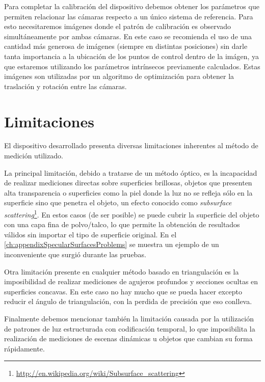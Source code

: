 Para completar la calibración del dispositivo debemos obtener los parámetros que permiten relacionar las cámaras respecto a un único sistema de referencia. Para esto necesitaremos imágenes donde el patrón de calibración es observado simultáneamente por ambas cámaras. En este caso se recomienda el uso de una cantidad más generosa de imágenes (siempre en distintas posiciones) sin darle tanta importancia a la ubicación de los puntos de control dentro de la imágen, ya que estaremos utilizando los parámetros intrínsecos previamente calculados. Estas imágenes son utilizadas por un algoritmo de optimización para obtener la traslación y rotación entre las cámaras.




\section{Limitaciones}
El dispositivo desarrollado presenta diversas limitaciones inherentes al método de medición utilizado. 

La principal limitación, debido a tratarse de un método óptico, es la incapacidad de realizar mediciones directas sobre superficies  brillosas, objetos que presenten alta transparencia o superficies como la piel donde la luz no se refleja sólo en la superficie sino que penetra el objeto, un efecto conocido como \emph{subsurface scattering}\footnote{\url{http://en.wikipedia.org/wiki/Subsurface_scattering}}. En estos casos (de ser posible) se puede cubrir la superficie del objeto con una capa fina de polvo/talco, lo que permite la obtención de resultados válidos sin importar el tipo de superficie original. En el \autoref{ch:appendixSpecularSurfacesProblems} se muestra un ejemplo de un inconveniente que surgió durante las pruebas.

Otra limitación presente en cualquier método basado en triangulación es la imposibilidad de realizar mediciones de agujeros profundos y secciones ocultas en superficies concavas. En este caso no hay mucho que se pueda hacer excepto reducir el ángulo de triangulación, con la perdida de precisión que eso conlleva.

Finalmente debemos mencionar también la limitación causada por la utilización de patrones de luz estructurada con codificación temporal, lo que imposibilita la realización de mediciones de escenas dinámicas u objetos que cambian su forma rápidamente.



